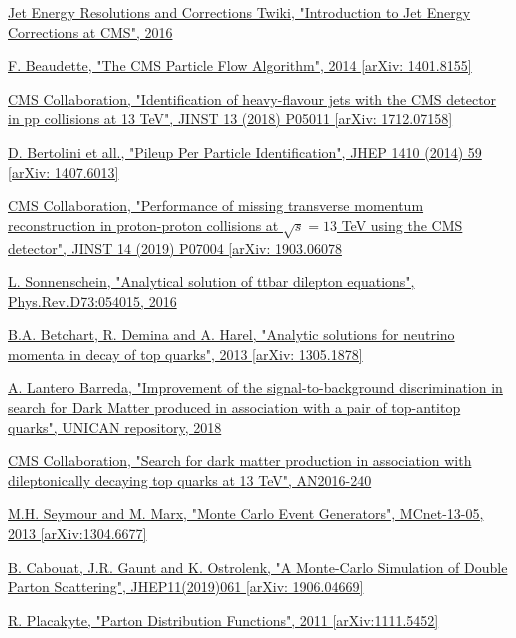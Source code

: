 \documentclass[a4paper, 10pt, openright]{report}
\begin{document}
\begin{thebibliography}{1}
\href{https://twiki.cern.ch/twiki/bin/view/CMS/IntroToJEC}{Jet Energy Resolutions and Corrections Twiki,
"Introduction to Jet Energy Corrections at CMS",
2016}

\href{https://arxiv.org/abs/1401.8155}{F. Beaudette,
"The CMS Particle Flow Algorithm",
2014 [arXiv: 1401.8155]}

\href{https://arxiv.org/abs/1712.07158}{CMS Collaboration,
"Identification of heavy-flavour jets with the CMS detector in pp collisions at 13 TeV",
JINST 13 (2018) P05011 [arXiv: 1712.07158]}

\href{https://arxiv.org/pdf/1407.6013.pdf}{D. Bertolini et all.,
"Pileup Per Particle Identification", 
JHEP 1410 (2014) 59 [arXiv: 1407.6013]}

\href{https://arxiv.org/abs/1903.06078}{CMS Collaboration,
"Performance of missing transverse momentum reconstruction in proton-proton collisions at $\sqrt{s} = 13$ TeV using the CMS detector",
JINST 14 (2019) P07004 [arXiv: 1903.06078}

\href{https://arxiv.org/abs/hep-ph/0603011}{L. Sonnenschein,
"Analytical solution of ttbar dilepton equations",
Phys.Rev.D73:054015, 2016}

\href{https://arxiv.org/pdf/1305.1878.pdf}{B.A. Betchart, R. Demina and A. Harel,
"Analytic solutions for neutrino momenta in decay of top quarks",
2013 [arXiv: 1305.1878]}

\href{https://repositorio.unican.es/xmlui/bitstream/handle/10902/15648/Lantero\%20Barreda\%20Agustin.pdf}{A. Lantero Barreda,
"Improvement of the signal-to-background discrimination in search for Dark Matter produced in association with a pair of top-antitop quarks",
UNICAN repository, 2018}

\href{http://cms.cern.ch/iCMS/user/noteinfo?cmsnoteid=CMS\%20AN-2016/240}{CMS Collaboration,
"Search for dark matter production in association with dileptonically decaying top quarks at 13 TeV", AN2016-240}

\href{https://arxiv.org/abs/1304.6677}{M.H. Seymour and M. Marx,
"Monte Carlo Event Generators",
MCnet-13-05, 2013 [arXiv:1304.6677]}

\href{https://arxiv.org/abs/1906.04669}{B. Cabouat, J.R. Gaunt and K. Ostrolenk,
"A Monte-Carlo Simulation of Double Parton Scattering",
JHEP11(2019)061 [arXiv: 1906.04669]}

\href{https://arxiv.org/abs/1111.5452}{R. Placakyte,
"Parton Distribution Functions",
2011 [arXiv:1111.5452]}


\end{thebibliography}
\end{document}
